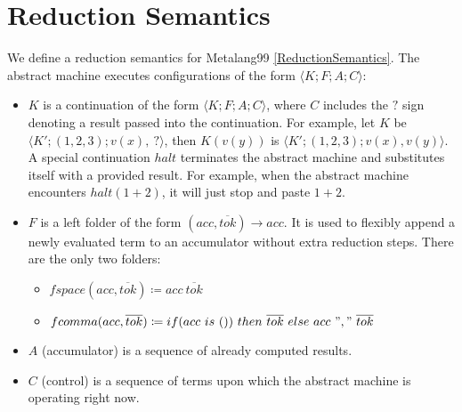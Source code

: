 \documentclass[12pt]{article}
\theoremstyle{break}
\begin{document}
\section{Reduction Semantics}

We define a reduction semantics for Metalang99 \ref{ReductionSemantics}. The abstract
machine executes configurations of the form $\langle K; F; A; C \rangle$:

\begin{itemize}
    \item $K$ is a continuation of the form $\langle K; F; A; C \rangle$, where
    $C$ includes the $?$ sign denoting a result passed into the continuation.
    For example, let $K$ be $\langle K'; (1, 2, 3); v(x), \ ? \rangle$,
    then $K(v(y))$ is $\langle K'; (1, 2, 3); v(x), v(y) \rangle$. A special
    continuation $halt$ terminates the abstract machine and substitutes itself
    with a provided result. For example, when the abstract machine encounters
    $halt(1 + 2)$, it will just stop and paste $1 + 2$.

    \item $F$ is a left folder of the form $(acc, \overline{tok}) \to acc$. It is used
    to flexibly append a newly evaluated term to an accumulator without extra reduction
    steps. There are the only two folders:
    \begin{itemize}
        \item $fspace(acc, \overline{tok}) \coloneqq acc \ \overline{tok}$
        \item $fcomma(acc, \overline{tok}) \coloneqq if (acc \ is \ ()) \ then \ \overline{tok} \ else \ acc \ "," \ \overline{tok}$
    \end{itemize}

    \item $A$ (accumulator) is a sequence of already computed results.

    \item $C$ (control) is a sequence of terms upon which the abstract
    machine is operating right now.
\end{itemize}
\end{document}
